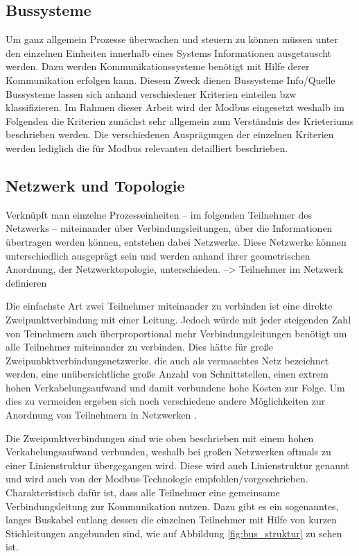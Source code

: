 \subsection{Bussysteme} 
Um ganz allgemein Prozesse überwachen und steuern zu können müssen unter den einzelnen Einheiten innerhalb eines Systems Informationen ausgetauscht werden. Dazu werden Kommunikationssysteme benötigt mit Hilfe derer Kommunikation erfolgen kann. Diesem Zweck dienen Bussysteme
Info/Quelle 
Bussysteme lassen sich anhand verschiedener Kriterien einteilen bzw klassifizieren. Im Rahmen dieser Arbeit wird der Modbus eingesetzt weshalb im Folgenden die Kriterien zunächst sehr allgemein zum Verständnis des Krieteriums beschrieben werden. Die verschiedenen Ausprägungen der einzelnen Kriterien werden lediglich die für Modbus relevanten detailliert beschrieben.

\subsection{Netzwerk und Topologie}
Verknüpft man einzelne Prozesseinheiten -- im folgenden Teilnehmer des Netzwerks -- miteinander über Verbindungsleitungen, über die Informationen übertragen werden können, entstehen dabei Netzwerke. Diese Netzwerke können unterschiedlich ausgeprägt sein und werden anhand ihrer geometrischen Anordnung, der Netzwerktopologie, unterschieden.
--> Teilnehmer im Netzwerk definieren

Die einfachste Art zwei Teilnehmer miteinander zu verbinden ist eine direkte Zweipunktverbindung mit einer Leitung. Jedoch würde mit jeder steigenden Zahl von Teinehmern auch überproportional mehr Verbindungsleitungen benötigt um alle Teilnehmer miteinander zu verbinden. Dies hätte für große Zweipunbktverbindungsnetzwerke. die auch als vermaschtes Netz bezeichnet werden, eine unübersichtliche große Anzahl von Schnittstellen, einen extrem hohen Verkabelungsaufwand und damit verbundene hohe Kosten zur Folge. Um dies zu vermeiden ergeben sich noch verschiedene andere Möglichkeiten zur Anordnung von Teilnehmern in Netzwerken \cite[S.~1f.]{schn06}.

Die Zweipunktverbindungen sind wie oben beschrieben mit einem hohen Verkabelungsaufwand verbunden, weshalb bei großen Netzwerken oftmals zu einer Linienstruktur übergegangen wird. Diese wird auch Linienstruktur genannt und wird auch von der Modbus-Technologie empfohlen/vorgeschrieben. Charakteristisch dafür ist, dass alle Teilnehmer eine gemeinsame Verbindungsleitung zur Kommunikation nutzen. Dazu gibt es ein sogenanntes, langes Buskabel entlang dessen die einzelnen Teilnehmer mit Hilfe von kurzen Stichleitungen angebunden sind, wie auf Abbildung \ref{fig:bus_struktur} zu sehen ist.

